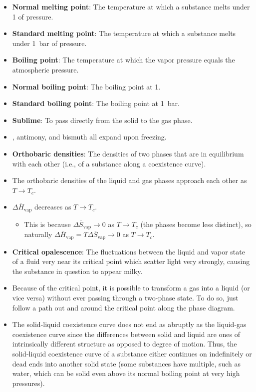 \documentclass[../notes.tex]{subfiles}
\begin{document}
\begin{itemize}
\begin{equation*}
    \end{equation*}
    \item \textbf{Normal melting point}: The temperature at which a substance melts under \SI{1}{\atmosphere} of pressure.
    \item \textbf{Standard melting point}: The temperature at which a substance melts under \SI{1}{\bar} of pressure.
    \item \textbf{Boiling point}: The temperature at which the vapor pressure equals the atmospheric pressure.
    \item \textbf{Normal boiling point}: The boiling point at \SI{1}{\atmosphere}.
    \item \textbf{Standard boiling point}: The boiling point at \SI{1}{\bar}.
    \item \textbf{Sublime}: To pass directly from the solid to the gas phase.
    \item {}, antimony, and bismuth all expand upon freezing.
    \item \textbf{Orthobaric densities}: The densities of two phases that are in equilibrium with each other (i.e., of a substance along a coexistence curve).
    \item The orthobaric densities of the liquid and gas phases approach each other as $T\to T_c$.
    \item $\Delta\overline{H}_\text{vap}$ decreases as $T\to T_c$.
    \begin{itemize}
        \item This is because $\Delta\overline{S}_\text{vap}\to 0$ as $T\to T_c$ (the phases become less distinct), so naturally $\Delta\overline{H}_\text{vap}=T\Delta\overline{S}_\text{vap}\to 0$ as $T\to T_c$.
    \end{itemize}
    \item \textbf{Critical opalescence}: The fluctuations between the liquid and vapor state of a fluid very near its critical point which scatter light very strongly, causing the substance in question to appear milky.
    \item Because of the critical point, it is possible to transform a gas into a liquid (or vice versa) without ever passing through a two-phase state. To do so, just follow a path out and around the critical point along the phase diagram.
    \item The solid-liquid coexistence curve does not end as abruptly as the liquid-gas coexistence curve since the differences between solid and liquid are ones of intrinsically different structure as opposed to degree of motion. Thus, the solid-liquid coexistence curve of a substance either continues on indefinitely or dead ends into another solid state (some substances have multiple, such as water, which can be solid even above its normal boiling point at very high pressures).

\end{itemize}
\end{document}
